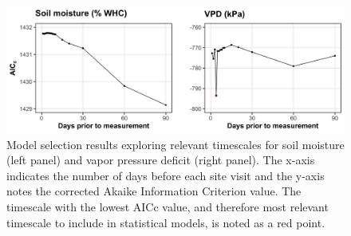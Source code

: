\newpage
\begin{landscape}
    \begin{figure}
        \centering
        \includegraphics[scale = 0.07]{ch4_TXeco/figs/TXeco_figS2_aicc.png}
        \caption[Model selection results exploring relevant timescales for soil moisture and vapor pressure deficit]{Model selection results exploring relevant timescales for soil moisture (left panel) and vapor pressure deficit (right panel). The x-axis indicates the number of days before each site visit and the y-axis notes the corrected Akaike Information Criterion value. The timescale with the lowest AICc value, and therefore most relevant timescale to include in statistical models, is noted as a red point.}
        \label{fig:figurec.1}
    \end{figure}
\end{landscape}
\clearpage

